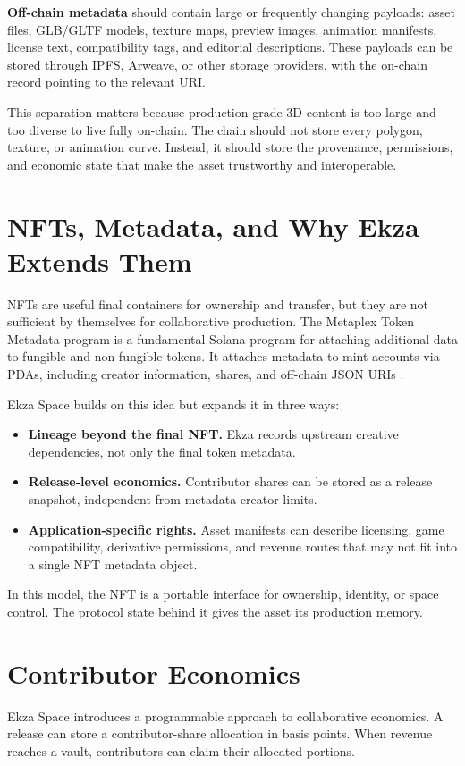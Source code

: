 \documentclass[10pt,twocolumn]{article}
\newcommand{\bp}{basis points}
\begin{document}
\textbf{Off-chain metadata} should contain large or frequently changing payloads: asset files, GLB/GLTF models, texture maps, preview images, animation manifests, license text, compatibility tags, and editorial descriptions. These payloads can be stored through IPFS, Arweave, or other storage providers, with the on-chain record pointing to the relevant URI.

This separation matters because production-grade 3D content is too large and too diverse to live fully on-chain. The chain should not store every polygon, texture, or animation curve. Instead, it should store the provenance, permissions, and economic state that make the asset trustworthy and interoperable.

\section{NFTs, Metadata, and Why Ekza Extends Them}
NFTs are useful final containers for ownership and transfer, but they are not sufficient by themselves for collaborative production. The Metaplex Token Metadata program is a fundamental Solana program for attaching additional data to fungible and non-fungible tokens. It attaches metadata to mint accounts via PDAs, including creator information, shares, and off-chain JSON URIs \cite{metaplex_token_metadata}.

Ekza Space builds on this idea but expands it in three ways:
\begin{itemize}
    \item \textbf{Lineage beyond the final NFT.} Ekza records upstream creative dependencies, not only the final token metadata.
    \item \textbf{Release-level economics.} Contributor shares can be stored as a release snapshot, independent from metadata creator limits.
    \item \textbf{Application-specific rights.} Asset manifests can describe licensing, game compatibility, derivative permissions, and revenue routes that may not fit into a single NFT metadata object.
\end{itemize}

In this model, the NFT is a portable interface for ownership, identity, or space control. The protocol state behind it gives the asset its production memory.

\section{Contributor Economics}
Ekza Space introduces a programmable approach to collaborative economics. A release can store a contributor-share allocation in \bp{}. When revenue reaches a vault, contributors can claim their allocated portions.
\end{document}
